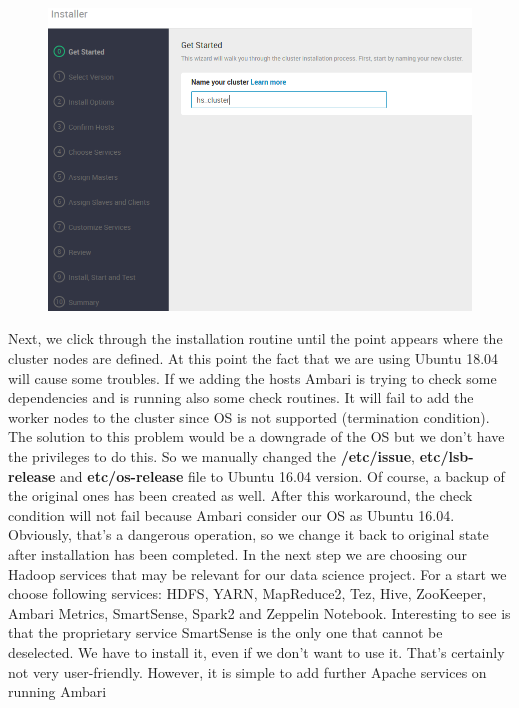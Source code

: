 \documentclass[12pt]{article}
\begin{document}
\begin{figure}[H]
\hspace{-2.3cm}
\includegraphics[width=1.3\textwidth]{img/hscluster}
\label{pic:hscluster}
\end{figure}
\noindent Next, we click through the installation routine until the point appears where the cluster nodes are defined. At this point the fact that we are using Ubuntu 18.04 will cause some troubles. If we adding the hosts Ambari is trying to check some dependencies and is running also some check routines. It will fail to add the worker nodes to the cluster since OS is not supported (termination condition). The solution to this problem would be a downgrade of the OS but we don’t have the privileges to do this. So we manually
changed the \textbf{/etc/issue}, \textbf{etc/lsb-release} and \textbf{etc/os-release} file to Ubuntu 16.04 version. Of course, a backup of the original ones has been created as well. After this workaround, the check condition will not fail because Ambari consider our OS as Ubuntu 16.04. Obviously, that’s a dangerous operation, so we change it back to original state after installation has been completed.
In the next step we are choosing our Hadoop services that may be relevant for our data science project. For a start we choose following services: HDFS, YARN, MapReduce2, Tez, Hive, ZooKeeper, Ambari Metrics,
SmartSense, Spark2 and Zeppelin Notebook. Interesting to see is that the proprietary service SmartSense
is the only one that cannot be deselected. We have to install it, even if we don’t want to use it. That’s
certainly not very user-friendly. However, it is simple to add further Apache services on running Ambari
\end{document}
